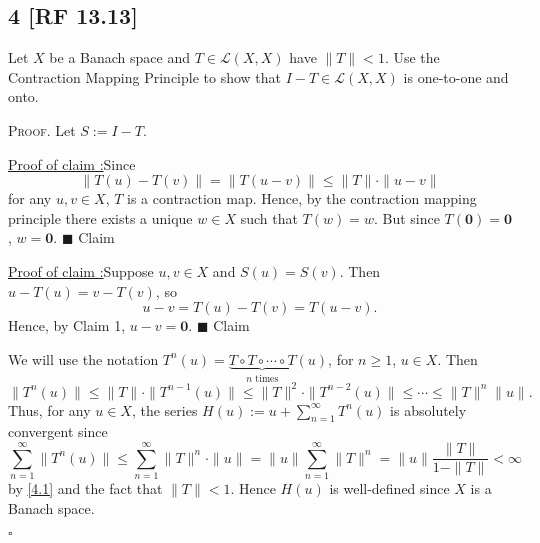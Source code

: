 \documentclass[12pt]{article}
\newcounter{ProofCounter}
\newcounter{ClaimCounter}[ProofCounter]
\newenvironment{Proof}{\stepcounter{ProofCounter}\textsc{Proof.}}{\hfill$\square$}
\newenvironment{claim}[1]{\vspace{1mm}\stepcounter{ClaimCounter}\par\noindent\underline{\bf Claim \theClaimCounter:}\space#1}{}
\newenvironment{claimproof}[1]{\par\noindent\underline{Proof of claim \theClaimCounter:}\space#1}{\hfill $\blacksquare$ Claim \theClaimCounter}
\begin{document}
\subsection*{4 [RF 13.13]}
\begin{tcolorbox}
  Let $X$ be a Banach space and $T \in \mathcal{L}(X,X)$ have $\|T\| < 1$. Use the Contraction Mapping Principle to show that $I - T \in
  \mathcal{L}(X,X)$ is one-to-one and onto.
\end{tcolorbox}
\begin{Proof}
  Let $S := I - T$. 
  \begin{claimproof}
    Since 
    \[ \|T(u) - T(v)\| = \|T(u-v)\| \leq \|T\|\cdot \|u - v\| \]
    for any $u, v \in X$, $T$ is a contraction map. Hence, by the contraction mapping principle there exists a unique $w \in X$ such that $T(w) = w$.
    But since $T(\bm{0}) = \bm{0}$, $w = \bm{0}$.
  \end{claimproof}

  \begin{claimproof}
    Suppose $u,v \in X$ and $S(u) = S(v)$. Then $u - T(u) = v - T(v)$, so 
    \[
      u-v = T(u) - T(v) = T(u-v). 
    \]
    Hence, by Claim 1, $u - v = \bm{0}$.
  \end{claimproof}

  We will use the notation $T^{n}(u) = \underbrace{T\circ T\circ \cdots \circ T}_{n\text{ times}}(u)$, for $n \geq 1$, $u \in X$. Then
  \begin{equation}
    \|T^{n}(u)\| \leq \|T\|\cdot \|T^{n-1}(u)\| \leq \|T\|^{2}\cdot \|T^{n-2}(u)\| \leq \cdots \leq \|T\|^{n}\|u\|.
    \label{4.1}
  \end{equation}
  Thus, for any $u \in X$, the series 
  $H(u) := u + \sum_{n=1}^{\infty}T^{n}(u)$
  is absolutely convergent since 
  \[
    \sum_{n=1}^{\infty}\|T^{n}(u)\| \leq \sum_{n=1}^{\infty}\|T\|^{n}\cdot \|u\| = \|u\| \sum_{n=1}^{\infty}\|T\|^{n} = \|u\|\frac{\|T\|}{1 - \|T\|} <
    \infty
  \]
  by \eqref{4.1} and the fact that $\|T\| < 1$. Hence $H(u)$ is well-defined since $X$ is a Banach space.


\end{Proof}
\end{document}
